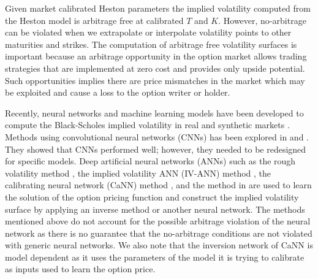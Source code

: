 \documentclass{article}
\theoremstyle{plain}%
\theoremstyle{definition}
\theoremstyle{remark}
\begin{document}
Given market calibrated Heston parameters the implied volatility computed from the Heston model is arbitrage free at calibrated $T$ and $K$. However, no-arbitrage can be violated when we extrapolate or interpolate volatility points to other maturities and strikes. The computation of arbitrage free volatility surfaces is important because an arbitrage opportunity in the option market allows trading strategies that are implemented at zero cost and provides only upside potential. Such opportunities implies there are price mismatches in the market which may be exploited and cause a loss to the option writer or holder.

Recently, neural networks and machine learning models have been developed to compute the Black-Scholes implied volatility in real and synthetic markets \citep{liu-2019-2,hernandez-2016,poggio-2017,spiegeleer-2018,dimitroff-2018,horvath-2021,liu-2019-1,hirsa-2019}. Methods using convolutional neural networks (CNNs) has been explored in \citep{hernandez-2016} and \citep{dimitroff-2018}. They showed that CNNs performed well; however, they needed to be redesigned for specific models. Deep artificial neural networks (ANNs) such as the rough volatility method \citep{horvath-2021}, the implied volatility ANN (IV-ANN) method \citep{liu-2019-1}, the calibrating neural network (CaNN) method \citep{liu-2019-2}, and the method in \citep{hirsa-2019} are used to learn the solution of the option pricing function and construct the implied volatility surface by applying an inverse method or another neural network. The methods mentioned above do not account for the possible arbitrage violation of the neural network as there is no guarantee that the no-arbitrage conditions are not violated with generic neural networks. We also note that the inversion network of CaNN is model dependent as it uses the parameters of the model it is trying to calibrate as inputs used to learn the option price.
\end{document}
